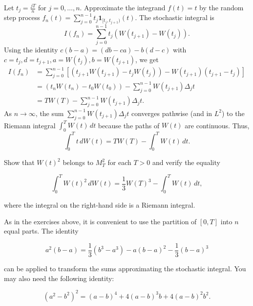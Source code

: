 \begin{Solution}
Let $t_j = \frac{jT}{n}$ for $j = 0, \ldots, n$. Approximate the integrand $f(t) = t$ by the random step process $f_n(t) = \sum_{j=0}^{n-1} t_j \mathbf{1}_{[t_j, t_{j+1})}(t)$. The stochastic integral is
\begin{equation*}
I(f_n) = \sum_{j=0}^{n-1} t_j (W(t_{j+1}) - W(t_j)).
\end{equation*}
Using the identity $c(b - a) = (db - ca) - b(d - c)$ with $c = t_j, d = t_{j+1}, a = W(t_j), b = W(t_{j+1})$, we get
\begin{align*}
I(f_n) &= \sum_{j=0}^{n-1} [ (t_{j+1} W(t_{j+1}) - t_j W(t_j)) - W(t_{j+1})(t_{j+1} - t_j) ] \\
&= (t_n W(t_n) - t_0 W(t_0)) - \sum_{j=0}^{n-1} W(t_{j+1}) \Delta_j t \\
&= T W(T) - \sum_{j=0}^{n-1} W(t_{j+1}) \Delta_j t.
\end{align*}
As $n \to \infty$, the sum $\sum_{j=0}^{n-1} W(t_{j+1}) \Delta_j t$ converges pathwise (and in $L^2$) to the Riemann integral $\int_0^T W(t) \, dt$ because the paths of $W(t)$ are continuous. Thus,
\begin{equation*}
\int_0^T t \, dW(t) = T W(T) - \int_0^T W(t) \, dt.
\end{equation*}
\end{Solution}

\begin{Exercise}
\label{ex:7.10}
Show that $W(t)^2$ belongs to $M_T^2$ for each $T > 0$ and verify the equality

\begin{equation}
\int_0^T W(t)^2 \, dW(t) = \frac{1}{3} W(T)^3 - \int_0^T W(t) \, dt,
\end{equation}

where the integral on the right-hand side is a Riemann integral.

\begin{hint}
As in the exercises above, it is convenient to use the partition of $[0, T]$ into $n$ equal parts. The identity

\begin{equation}
a^2(b - a) = \frac{1}{3}(b^3 - a^3) - a(b - a)^2 - \frac{1}{3}(b - a)^3
\end{equation}

can be applied to transform the sums approximating the stochastic integral. You may also need the following identity:

\begin{equation}
\left(a^2 - b^2\right)^2 = (a - b)^4 + 4(a - b)^3 b + 4(a - b)^2 b^2.
\end{equation}
\end{hint}
\end{Exercise}

